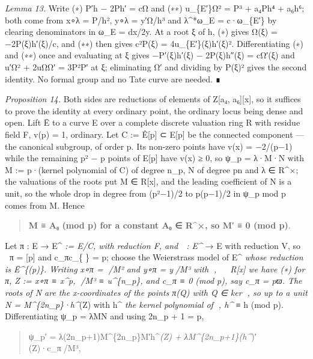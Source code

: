 \documentclass[11pt,a4paper]{article}
\theoremstyle{named}
\begin{document}
\textit{Lemma 13.} Write (∗) P′h − 2Ph′ = cΩ and (∗∗) u\_\{E′\}Ω² = P³ + a₄Ph⁴ + a₆h⁶; both come from x∘λ = P/h², y∘λ = y′Ω/h³ and λ\textasciicircum{}*ω\_E = c·ω\_\{E′\} by clearing denominators in ω\_E = dx/2y. At a root ξ of h, (∗) gives Ω(ξ) = −2P(ξ)h′(ξ)/c, and (∗∗) then gives c²P(ξ) = 4u\_\{E′\}(ξ)h′(ξ)². Differentiating (∗) and (∗∗) once and evaluating at ξ gives −P′(ξ)h′(ξ) − 2P(ξ)h″(ξ) = cΩ′(ξ) and u′Ω² + 2uΩΩ′ = 3P²P′ at ξ; eliminating Ω′ and dividing by P(ξ)² gives the second identity. No formal group and no Tate curve are needed. ∎

\textit{Proposition 14.} Both sides are reductions of elements of Z[a₄, a₆][x], so it suffices to prove the identity at every ordinary point, the ordinary locus being dense and open. Lift Ē to a curve E over a complete discrete valuation ring R with residue field F, v(p) = 1, ordinary. Let C := Ê[p] ⊂ E[p] be the connected component — the canonical subgroup, of order p. Its non-zero points have v(x) = −2/(p−1) while the remaining p² − p points of E[p] have v(x) ≥ 0, so ψ\_p = λ·M·N with M := p·(kernel polynomial of C) of degree n\_p, N of degree pn and λ ∈ R\textasciicircum{}×; the valuations of the roots put M ∈ R[x], and the leading coefficient of N is a unit, so the whole drop in degree from (p²−1)/2 to p(p−1)/2 in ψ\_p mod p comes from M. Hence

\begin{quote}
\textbf{M ≡ A₀ (mod p) for a constant A₀ ∈ R\textasciicircum{}×, so M′ ≡ 0 (mod p)}.
\end{quote}

Let π : E → E\textasciicircum{}\textit{ := E/C, with reduction F, and  : E\textasciicircum{}} → E with reduction V, so ∘π = [p] and c\_πc\_\{\} = p; choose the Weierstrass model of E\textasciicircum{}\textit{ whose reduction is Ē\textasciicircum{}\{(p)\}. Writing x∘π = /M² and y∘π = y/M³ with ,  ∈ R[x] we have (∗) for π, Z := x∘π ≡ x\textasciicircum{}p, /M³ ≡ u\textasciicircum{}\{n\_p\}, and c\_π ≡ 0 (mod p), say c\_π = pϖ. The roots of N are the x-coordinates of the points π(Q) with Q ∈ ker , so up to a unit N = M\textasciicircum{}\{2n\_p\}·h\textasciicircum{}}(Z) with h\textasciicircum{}\textit{ the kernel polynomial of , h\textasciicircum{}} ≡ h (mod p). Differentiating ψ\_p = λMN and using 2n\_p + 1 = p,

\begin{quote}
ψ\_p′ = λ(2n\_p+1)M\textasciicircum{}\{2n\_p\}M′h\textasciicircum{}\textit{(Z) + λM\textasciicircum{}\{2n\_p+1\}(h\textasciicircum{}})′(Z)·c\_π/M³,
\end{quote}
\end{document}
